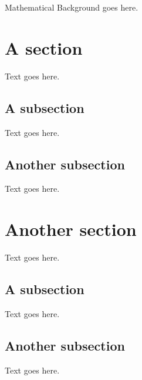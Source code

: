 Mathematical Background goes here.
\section{A section}
Text goes here.

\subsection{A subsection}
Text goes here.

\subsection{Another subsection}
Text goes here.


\section{Another section}
Text goes here.

\subsection{A subsection}
Text goes here.

\subsection{Another subsection}
Text goes here.


